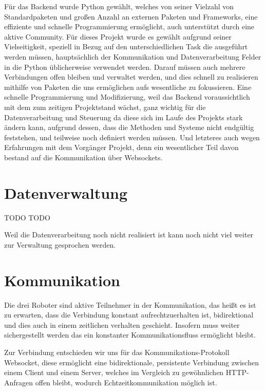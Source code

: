 Für das Backend wurde Python gewählt, 
welches von seiner Vielzahl von Standardpaketen und 
großen Anzahl an externen Paketen und Frameworks, 
eine effiziente und schnelle Programmierung ermöglicht, 
auch unterstützt durch eine aktive Community.
% 
Für dieses Projekt wurde es gewählt aufgrund seiner Vielseitigkeit, 
speziell in Bezug auf den unterschiedlichen Task die ausgeführt werden müssen, 
hauptsächlich der Kommunikation und Datenverarbeitung 
Felder in die Python üblicherweise verwendet werden.
% 
Darauf müssen auch mehrere Verbindungen offen bleiben und verwaltet werden,
und dies schnell zu realisieren mithilfe von Paketen 
die uns ermöglichen aufs wesentliche zu fokussieren.
% 
Eine schnelle Programmierung und Modifizierung, 
weil das Backend voraussichtlich mit dem zum zeitigen Projektstand wächst, 
ganz wichtig für die Datenverarbeitung und Steuerung 
da diese sich im Laufe des Projekts stark ändern kann,
aufgrund dessen, dass die Methoden und Systeme nicht endgültig feststehen, 
und teilweise noch definiert werden müssen.
% 
Und letzteres auch wegen Erfahrungen mit dem Vorgänger Projekt, 
denn ein wesentlicher Teil davon bestand auf die Kommunikation über Websockets.

\section{Datenverwaltung}
\label{subsec:backend_data}
TODO
TODO

Weil die Datenverarbeitung noch nicht realisiert ist 
kann noch nicht viel weiter zur Verwaltung gesprochen werden.

\section{Kommunikation}
\label{subsec:Kommunikation}
Die drei Roboter sind aktive Teilnehmer in der Kommunikation, 
das heißt es ist zu erwarten, dass die Verbindung konstant aufrechtzuerhalten ist,
bidirektional und dies auch in einem zeitlichen verhalten geschieht. 
Insofern muss weiter sichergestellt werden das ein konstanter Kommunikationsfluss 
ermöglicht bleibt.

Zur Verbindung entschieden wir uns für das Kommunikations-Protokoll Websocket, 
diese ermöglicht eine bidirektionale, 
persistente Verbindung zwischen einem Client und einem Server,
welches im Vergleich zu gewöhnlichen HTTP-Anfragen offen bleibt, 
wodurch Echtzeitkommunikation möglich ist.

